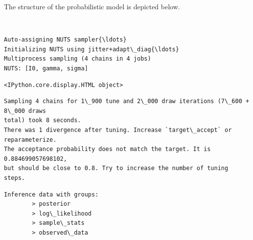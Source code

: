\documentclass[11pt]{article}
\begin{document}
    The structure of the probabilistic model is depicted below.
 
            
    
    \begin{center}
    \end{center}
    { \hspace*{\fill} \\}
    

    \begin{Verbatim}[commandchars=\\\{\}]
Auto-assigning NUTS sampler{\ldots}
Initializing NUTS using jitter+adapt\_diag{\ldots}
Multiprocess sampling (4 chains in 4 jobs)
NUTS: [I0, gamma, sigma]
    \end{Verbatim}

    
    \begin{Verbatim}[commandchars=\\\{\}]
<IPython.core.display.HTML object>
    \end{Verbatim}

    
    \begin{Verbatim}[commandchars=\\\{\}]
Sampling 4 chains for 1\_900 tune and 2\_000 draw iterations (7\_600 + 8\_000 draws
total) took 8 seconds.
There was 1 divergence after tuning. Increase `target\_accept` or reparameterize.
The acceptance probability does not match the target. It is 0.884699057698102,
but should be close to 0.8. Try to increase the number of tuning steps.
    \end{Verbatim}

            \begin{tcolorbox}[breakable, size=fbox, boxrule=.5pt, pad at break*=1mm, opacityfill=0]
\begin{Verbatim}[commandchars=\\\{\}]
Inference data with groups:
        > posterior
        > log\_likelihood
        > sample\_stats
        > observed\_data
\end{Verbatim}
\end{tcolorbox}
        
    \begin{center}
    \end{center}
    { \hspace*{\fill} \\}
    
\end{document}

